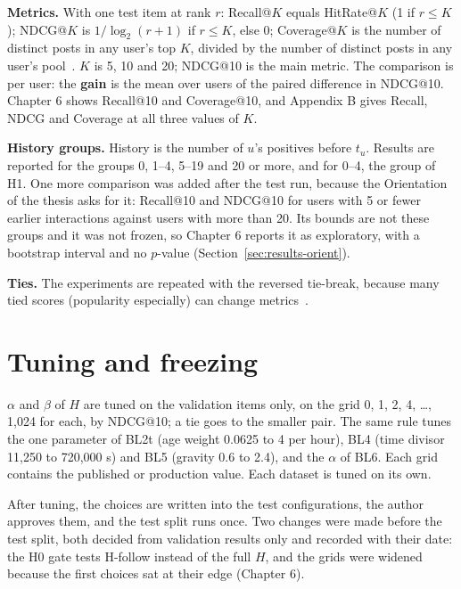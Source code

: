 \textbf{Metrics.} With one test item at rank $r$: Recall@$K$ equals HitRate@$K$ (1 if $r \le K$); NDCG@$K$ is $1/\log_2(r + 1)$ if $r \le K$, else 0; Coverage@$K$ is the number of distinct posts in any user's top $K$, divided by the number of distinct posts in any user's pool~. $K$ is 5, 10 and 20; NDCG@10 is the main metric. The comparison is per user: the \textbf{gain} is the mean over users of the paired difference in NDCG@10. Chapter 6 shows Recall@10 and Coverage@10, and Appendix B gives Recall, NDCG and Coverage at all three values of $K$.

\textbf{History groups.} History is the number of $u$'s positives before $t_u$. Results are reported for the groups 0, 1--4, 5--19 and 20 or more, and for 0--4, the group of H1. One more comparison was added after the test run, because the Orientation of the thesis asks for it: Recall@10 and NDCG@10 for users with 5 or fewer earlier interactions against users with more than 20. Its bounds are not these groups and it was not frozen, so Chapter 6 reports it as exploratory, with a bootstrap interval and no $p$-value (Section~\ref{sec:results-orient}).

\textbf{Ties.} The experiments are repeated with the reversed tie-break, because many tied scores (popularity especially) can change metrics~.

\section{Tuning and freezing}
\label{sec:method-tuning}

$\alpha$ and $\beta$ of $H$ are tuned on the validation items only, on the grid 0, 1, 2, 4, \ldots, 1,024 for each, by NDCG@10; a tie goes to the smaller pair. The same rule tunes the one parameter of BL2t (age weight 0.0625 to 4 per hour), BL4 (time divisor 11,250 to 720,000 s) and BL5 (gravity 0.6 to 2.4), and the $\alpha$ of BL6. Each grid contains the published or production value. Each dataset is tuned on its own.

After tuning, the choices are written into the test configurations, the author approves them, and the test split runs once. Two changes were made before the test split, both decided from validation results only and recorded with their date: the H0 gate tests H-follow instead of the full $H$, and the grids were widened because the first choices sat at their edge (Chapter 6).

